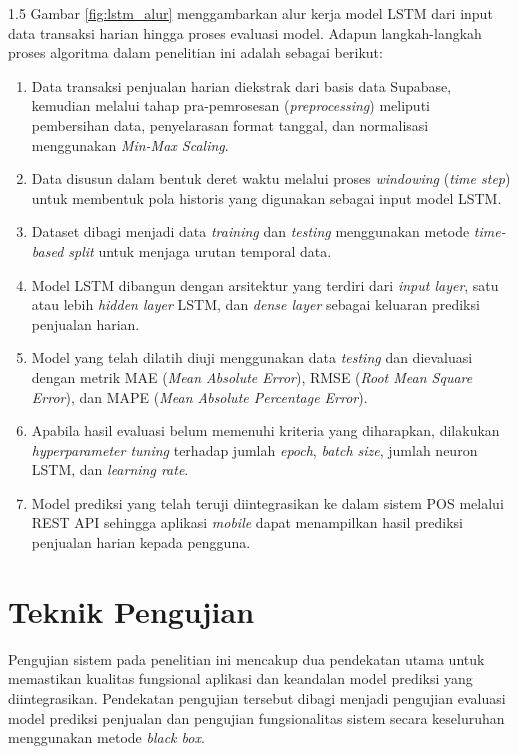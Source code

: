 \documentclass[12pt, a4paper, onecolumn, oneside]{report}
\begin{document}
\begin{spacing}{1.5}
Gambar \ref{fig:lstm_alur} menggambarkan alur kerja model LSTM dari input data transaksi harian hingga proses evaluasi model. Adapun langkah-langkah proses algoritma dalam penelitian ini adalah sebagai berikut:
\begin{enumerate}
    \item Data transaksi penjualan harian diekstrak dari basis data Supabase, kemudian melalui tahap pra-pemrosesan (\textit{preprocessing}) meliputi pembersihan data, penyelarasan format tanggal, dan normalisasi menggunakan \textit{Min-Max Scaling}.
    \item Data disusun dalam bentuk deret waktu melalui proses \textit{windowing} (\textit{time step}) untuk membentuk pola historis yang digunakan sebagai input model LSTM.
    \item Dataset dibagi menjadi data \textit{training} dan \textit{testing} menggunakan metode \textit{time-based split} untuk menjaga urutan temporal data.
    \item Model LSTM dibangun dengan arsitektur yang terdiri dari \textit{input layer}, satu atau lebih \textit{hidden layer} LSTM, dan \textit{dense layer} sebagai keluaran prediksi penjualan harian.
    \item Model yang telah dilatih diuji menggunakan data \textit{testing} dan dievaluasi dengan metrik MAE (\textit{Mean Absolute Error}), RMSE (\textit{Root Mean Square Error}), dan MAPE (\textit{Mean Absolute Percentage Error}).
    \item Apabila hasil evaluasi belum memenuhi kriteria yang diharapkan, dilakukan \textit{hyperparameter tuning} terhadap jumlah \textit{epoch}, \textit{batch size}, jumlah neuron LSTM, dan \textit{learning rate}.
    \item Model prediksi yang telah teruji diintegrasikan ke dalam sistem POS melalui REST API sehingga aplikasi \textit{mobile} dapat menampilkan hasil prediksi penjualan harian kepada pengguna.
\end{enumerate}

\section{Teknik Pengujian}

Pengujian sistem pada penelitian ini mencakup dua pendekatan utama untuk memastikan kualitas fungsional aplikasi dan keandalan model prediksi yang diintegrasikan. Pendekatan pengujian tersebut dibagi menjadi pengujian evaluasi model prediksi penjualan dan pengujian fungsionalitas sistem secara keseluruhan menggunakan metode \textit{black box}.


\end{spacing}
\end{document}

